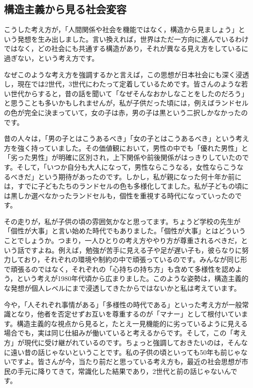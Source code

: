 \documentclass{ltjsbook}
\begin{document}
\subsection{構造主義から見る社会変容}

こうした考え方が，「人間関係や社会を機能ではなく，構造から見ましょう」という発想を生み出しました。言い換えれば，世界はただ一方向に進んでいるわけではなく，どの社会にも共通する構造があり，それが異なる見え方をしているに過ぎない，という考え方です。

なぜこのような考え方を強調するかと言えば，この思想が日本社会にも深く浸透し，現在では2世代，3世代にわたって定着しているためです。皆さんのような若い世代からすると，昔の話を聞いて「なぜそんなおかしなことをしたのだろう」と思うことも多いかもしれませんが，私が子供だった頃には，例えばランドセルの色が完全に決まっていて，女の子は赤，男の子は黒という二択しかなかったのです。

昔の人々は，「男の子とはこうあるべき」「女の子とはこうあるべき」という考え方を強く持っていました。その価値観において，男性の中でも「優れた男性」と「劣った男性」が明確に区別され，上下関係や前後関係がはっきりしていたのです。そして，「いつか自分も大人になって，男性ならこうなる，女性ならこうなるべきだ」という期待があったのです。しかし，私が親になった何十年か前には，すでに子どもたちのランドセルの色も多様化してました。私が子どもの頃には黒しか選べなかったランドセルも，個性を重視する時代になっていったのです。

その走りが，私が子供の頃の雰囲気かなと思ってます。ちょうど学校の先生が「個性が大事」と言い始めた時代でもありました。「個性が大事」とはどういうことでしょうか。つまり，一人ひとりの考え方ややり方が尊重されるべきだ，という話ですよね。例えば，勉強が苦手に見える子や足が遅い子も，彼らなりに努力しており，それぞれの環境や制約の中で頑張っているのです。みんなが同じ形で頑張るのではなく，それぞれの「心持ちの持ち方」も含めて多様性を認めよう，という考えが1980年代頃から広まりました。このような姿勢は，構造主義的な発想が個人レベルにまで浸透してきたからではないかと私は考えています。

今や，「人それぞれ事情がある」「多様性の時代である」といった考え方が一般常識となり，他者を否定せずお互いを尊重するのが「マナー」として根付いています。構造主義的な視点から見ると，たとえ一見機能的に劣っているように見える場合でも，実は同じ仕組みが働いていると考えるからです。そして，この「考え方」が現代に受け継がれているのです。ちょっと強調しておきたいのは，そんなに遠い昔の話じゃないということです。私の子供の頃といっても50年も前じゃないですよ。皆さんが今，当たり前だと思っている考え方も，最近の社会思想が市民の手元に降りてきて，常識化した結果であり，2世代と前の話じゃないんです。
\end{document}
